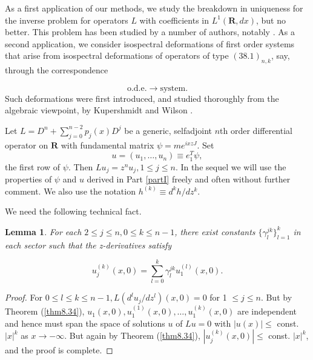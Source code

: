 \documentclass{surv-l}
\theoremstyle{plain}
\newtheorem{lem}[theorem]{Lemma}
\theoremstyle{definition}
\numberwithin{equation}{chapter}
\begin{document}
As a first application of our methods, we study the breakdown in uniqueness for the inverse problem for operators $L$ with coefficients in $L^{1}(\textbf{R}, dx)$, but no better. This problem has been studied by a number of authors, notably \cite{ADM, AN, DS}. As a second application, we consider isospectral deformations of first order systems that arise from isospectral deformations of operators of type $\mathrm{(38.1)}_{n,k}$, say, through the correspondence

\begin{equation*}
\mathrm{o.d.e}. \rightarrow \mathrm{system}.
\end{equation*}
Such deformations were first introduced, and studied thoroughly from the algebraic viewpoint, by Kupershmidt and Wilson \cite{KW}.

Let $L=D^{n}+ \sum_{j=0}^{n-2}p_{j}(x)D^{j}$ be a generic, selfadjoint $n$th order differential operator on $\textbf{R}$ with fundamental matrix $\psi=me^{ixzJ}$. Set
\begin{equation}\label{eq38.2}
u=(u_{1},\ldots,u_{n})\equiv e_{1}^{T}\psi,
\end{equation}
the first row of $\psi$. Then $Lu_{j}=z^{n}u_{j},1\leq j\leq n$. In the sequel we will use the properties of $\psi$ and $u$ derived in Part \ref{partI} freely and often without further comment. We also use the notation $h^{(k)}\equiv d^{k}h/dz^{k}$.

We need the following technical fact.
\renewcommand\thetheorem{38.\arabic{theorem}}
\setcounter{theorem}{2}
\begin{lem}\label{lem38.3}
For each $2\leq j\leq n, 0\leq k\leq n-1$, there exist constants $\{\gamma_{l}^{j k}\}_{l=1}^{k}$ in each sector such that the z-derivatives satisfy
\end{lem}
\setcounter{equation}{3}
\begin{equation}\label{eq38.4}
u_{j}^{(k)}(x,0)=\sum_{l=0}^{k}\gamma_{l}^{jk}u_{1}^{(l)}(x,0).
\end{equation}

\begin{proof}
For $0\leq l\leq k\leq n -1, L(d^{l}u_{j}/dz^{l})(x,0)=0$ for 1 $\leq j\leq n.$ But by Theorem (\ref{thm8.34}), $u_{1}(x, 0),u_{1}^{(1)}(x, 0),\ldots,u_{1}^{(k)}(x,0)$ are independent and hence must span the space of solutions $u$ of $Lu=0$ with $|u(x)|\leq$ const.$|x|^{k}$ as $ x\rightarrow-\infty$. But again by Theorem (\ref{thm8.34}), $|u_{j}^{(k)}(x, 0)|\leq$ const. $|x|^{k}$, and the proof is complete.
\end{proof}
\end{document}
